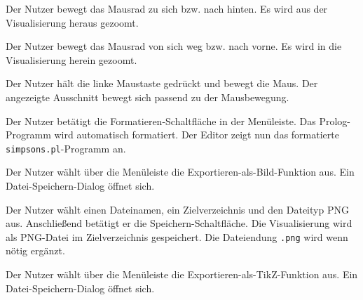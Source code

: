 \documentclass[parskip=full,11pt,twoside]{scrartcl}
\begin{document}

{Der Nutzer bewegt das Mausrad zu sich bzw. nach hinten.}
{Es wird aus der Visualisierung heraus gezoomt.}

{Der Nutzer bewegt das Mausrad von sich weg bzw. nach vorne.}
{Es wird in die Visualisierung herein gezoomt.}


{Der Nutzer hält die linke Maustaste gedrückt und bewegt die Maus.}
{Der angezeigte Ausschnitt bewegt sich passend zu der Mausbewegung.}


{Der Nutzer betätigt die Formatieren-Schaltfläche in der Menüleiste.}
{Das Prolog-Programm wird automatisch formatiert. Der Editor zeigt nun das formatierte \texttt{simpsons.pl}-Programm an.}


{Der Nutzer wählt über die Menüleiste die Exportieren-als-Bild-Funktion aus.}
{Ein Datei-Speichern-Dialog öffnet sich.}

{Der Nutzer wählt einen Dateinamen, ein Zielverzeichnis und den Dateityp PNG aus. Anschließend betätigt er die Speichern-Schaltfläche.}
{Die Visualisierung wird als PNG-Datei im Zielverzeichnis gespeichert. Die Dateiendung \texttt{.png} wird wenn nötig ergänzt.}


{Der Nutzer wählt über die Menüleiste die Exportieren-als-TikZ-Funktion aus.}
{Ein Datei-Speichern-Dialog öffnet sich.}
\end{document}
